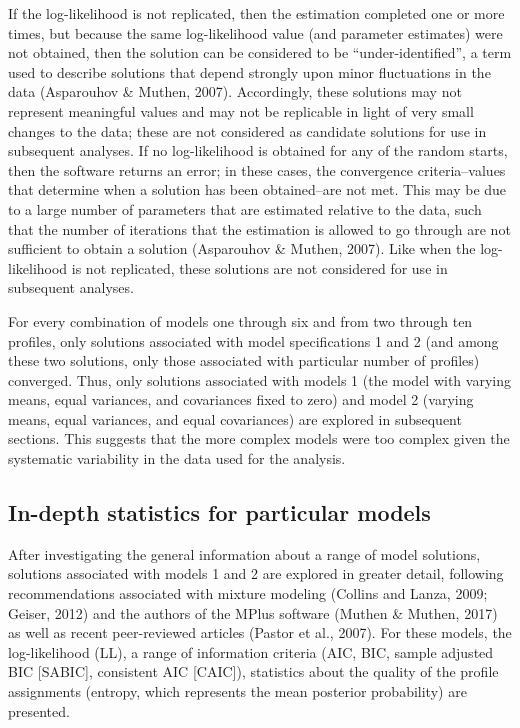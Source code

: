 \documentclass[]{msu-thesis}
\theoremstyle{definition}
\theoremstyle{definition}
\theoremstyle{definition}
\theoremstyle{remark}
\begin{document}
If the log-likelihood is not replicated, then the estimation completed
one or more times, but because the same log-likelihood value (and
parameter estimates) were not obtained, then the solution can be
considered to be ``under-identified'', a term used to describe solutions
that depend strongly upon minor fluctuations in the data (Asparouhov \&
Muthen, 2007). Accordingly, these solutions may not represent meaningful
values and may not be replicable in light of very small changes to the
data; these are not considered as candidate solutions for use in
subsequent analyses. If no log-likelihood is obtained for any of the
random starts, then the software returns an error; in these cases, the
convergence criteria--values that determine when a solution has been
obtained--are not met. This may be due to a large number of parameters
that are estimated relative to the data, such that the number of
iterations that the estimation is allowed to go through are not
sufficient to obtain a solution (Asparouhov \& Muthen, 2007). Like when
the log-likelihood is not replicated, these solutions are not considered
for use in subsequent analyses.

For every combination of models one through six and from two through ten
profiles, only solutions associated with model specifications 1 and 2
(and among these two solutions, only those associated with particular
number of profiles) converged. Thus, only solutions associated with
models 1 (the model with varying means, equal variances, and covariances
fixed to zero) and model 2 (varying means, equal variances, and equal
covariances) are explored in subsequent sections. This suggests that the
more complex models were too complex given the systematic variability in
the data used for the analysis.

\subsection{In-depth statistics for particular
models}\label{in-depth-statistics-for-particular-models}

After investigating the general information about a range of model
solutions, solutions associated with models 1 and 2 are explored in
greater detail, following recommendations associated with mixture
modeling (Collins and Lanza, 2009; Geiser, 2012) and the authors of the
MPlus software (Muthen \& Muthen, 2017) as well as recent peer-reviewed
articles (Pastor et al., 2007). For these models, the log-likelihood
(LL), a range of information criteria (AIC, BIC, sample adjusted BIC
{[}SABIC{]}, consistent AIC {[}CAIC{]}), statistics about the quality of
the profile assignments (entropy, which represents the mean posterior
probability) are presented.
\end{document}
